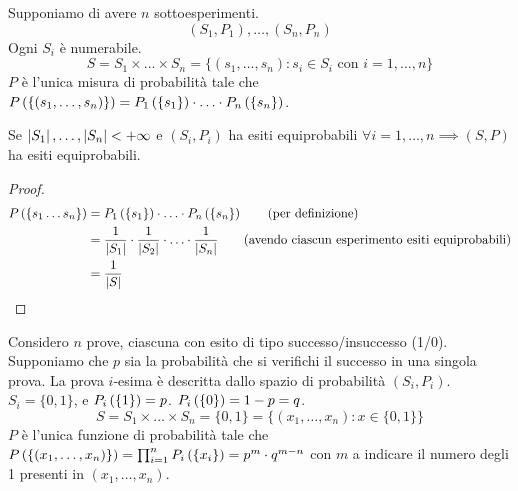 
Supponiamo di avere $n$ sottoesperimenti.
\[
(S_1, P_1), \ldots, (S_n, P_n)
\]
Ogni $S_i$ \`e numerabile.
\[
S = S_1 \times \ldots \times S_n = \{ (s_1, \dots, s_n) : s_i \in S_i \text{ con } i = 1, \ldots, n \}
\]
$P$ \`e l'unica misura di probabilit\`a tale che $\prob{\{(s_1, \dots, s_n)\}} = \prob[P_1]{\{s_1\}} \cdot \ldots \cdot \prob[P_n]{\{s_n\}}$.

\begin{prop}
Se $\abs{S_1}, \ldots, \abs{S_n} < + \infty$ e $(S_i, P_i)$  ha esiti equiprobabili $\forall  i = 1, \ldots, n \implies (S, P)$ ha esiti equiprobabili.
\end{prop}
\begin{proof}
\begin{align*}
\prob{\{s_1 \ldots s_n\}} &= \prob[P_1]{\{s_1\}} \cdot \ldots \cdot \prob[P_n]{\{s_n\}} \tag{per definizione} \\
&= \frac{1}{\abs{S_1}} \cdot \frac{1}{\abs{S_2}} \cdot \ldots \cdot \frac{1}{\abs{S_n}} \tag{avendo ciascun esperimento esiti equiprobabili} \\
&= \frac{1}{\abs{S}}
\end{align*}
\end{proof}

Considero $n$ prove, ciascuna con esito di tipo successo/insuccesso (1/0). Supponiamo che $p$ sia la probabilit\`a che si verifichi il successo in una singola prova. La prova $i$-esima \`e descritta dallo spazio di probabilit\`a $(S_i, P_i)$. $S_i = \{0,1\}$, e $\prob[P_i]{\{1\}} = p$. $\prob[P_i]{\{0\}} = 1 - p = q$.
\[
S = S_1 \times \dots \times S_n = \{0,1\} = \{ (x_1, \dots, x_n) : x \in \{ 0, 1 \}\}
\]
$P$ \`e l'unica funzione di probabilit\`a tale che $\prob{\{(x_1, \dots, x_n)\}} = \prod_{i = 1}^{n} \prob[P_i]{\{x_i\}} = p^m \cdot q^{m-n}$ con $m $ a indicare il numero degli 1 presenti in $(x_1, \dots, x_n)$.

